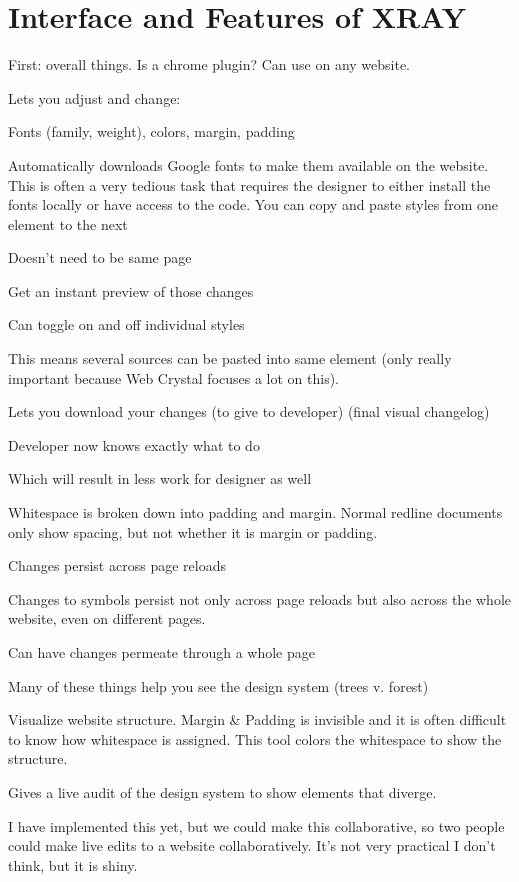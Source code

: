 \documentclass{sigchi}
\begin{document}
\section{Interface and Features of XRAY}
First: overall things. Is a chrome plugin? Can use on any website. 

Lets you adjust and change: 


Fonts (family, weight), colors, margin, padding

Automatically downloads Google fonts to make them available on the website. This is often a very tedious task that requires the designer to either install the fonts locally or have access to the code.
You can copy and paste styles from one element to the next 


Doesn’t need to be same page

Get an instant preview of those changes

Can toggle on and off individual styles 

This means several sources can be pasted into same element (only really important because Web Crystal focuses a lot on this).

Lets you download your changes (to give to developer) (final visual changelog)

Developer now knows exactly what to do

Which will result in less work for designer as well

Whitespace is broken down into padding and margin. Normal redline documents only show spacing, but not whether it is margin or padding.

Changes persist across page reloads 

Changes to symbols persist not only across page reloads but also across the whole website, even on different pages. 

Can have changes permeate through a whole page

Many of these things help you see the design system (trees v. forest) 

Visualize website structure. Margin \& Padding is invisible and it is often difficult to know how whitespace is assigned. This tool colors the whitespace to show the structure.

Gives a live audit of the design system to show elements that diverge. 

I have implemented this yet, but we could make this collaborative, so two people could make live edits to a website collaboratively. It’s not very practical I don’t think, but it is shiny.
\end{document}
